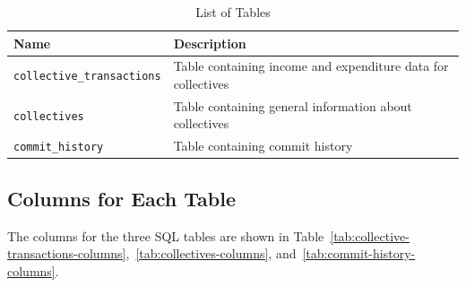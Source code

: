 \documentclass[11pt]{ist-thesis-lt}
\begin{document}
\begin{table}[htbp]
    \centering
    \caption{List of Tables}\label{tab:tables-summary}
    \begin{tabular}{ll}
        \toprule
        Name & Description \\
        \midrule
        \texttt{collective\_transactions} & Table containing income and expenditure data for collectives \\
        \texttt{collectives}             & Table containing general information about collectives \\
        \texttt{commit\_history}          & Table containing commit history \\
        \bottomrule
    \end{tabular}
\end{table}

\subsection{Columns for Each Table}
The columns for the three SQL tables are shown in Table~\ref{tab:collective-transactions-columns},~\ref{tab:collectives-columns}, and~\ref{tab:commit-history-columns}.
\end{document}
